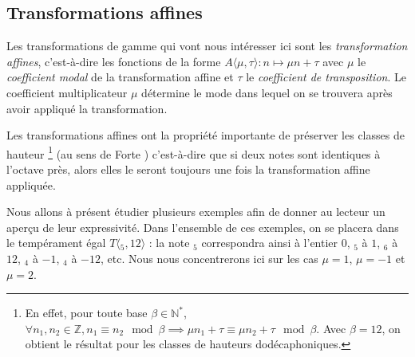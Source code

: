 \subsection{Transformations affines}

Les transformations de gamme qui vont nous intéresser ici sont les \emph{transformation affines}, c'est-à-dire les fonctions de la forme $A\langle\mu,\tau\rangle : n \mapsto \mu n + \tau$ avec $\mu$ le \emph{coefficient modal} de la transformation affine et $\tau$ le \emph{coefficient de transposition}. Le coefficient multiplicateur $\mu$ détermine le mode dans lequel on se trouvera après avoir appliqué la transformation. 

Les transformations affines ont la propriété importante de préserver les classes de hauteur \footnote{En effet, pour toute base $\beta\in \mathbb{N}^*$, $\forall n_1,n_2 \in \mathbb{Z}, n_1 \equiv n_2 \mod \beta \implies \mu n_1 + \tau \equiv \mu n_2 + \tau \mod \beta$. Avec $\beta=12$, on obtient le résultat pour les classes de hauteurs dodécaphoniques. }  (au sens de Forte \cite{forte1973structure}) c'est-à-dire que si deux notes sont identiques à l'octave près, alors elles le seront toujours une fois la transformation affine appliquée. 

Nous allons à présent étudier plusieurs exemples afin de donner au lecteur un aperçu de leur expressivité. Dans l'ensemble de ces exemples, on se placera dans le tempérament égal $T\langle $$_5,12\rangle$ : la note $_5$ correspondra ainsi à l'entier $0$, $_5$ à $1$, $_6$ à $12$, $_4$ à $-1$, $_4$ à $-12$, etc. Nous nous concentrerons ici sur les cas $\mu = 1$, $\mu = -1$ et $\mu = 2$.
